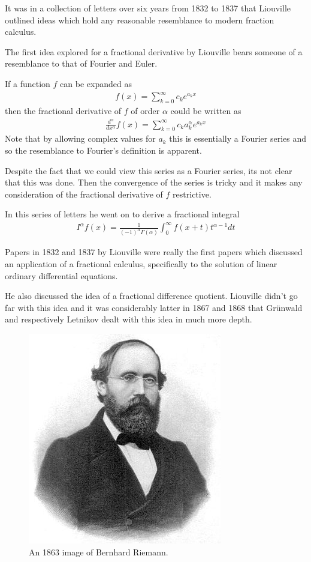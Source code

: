 It was in a collection of letters over six years from 1832 to 1837 that Liouville outlined ideas which hold any reasonable resemblance to modern fraction calculus. 

The first idea explored for a fractional derivative by Liouville bears someone of a resemblance to that of Fourier and Euler. 

If a function $ f $ can be expanded as 
\begin{align}
	f(x) = \sum_{k=0}^\infty c_k e^{a_kx}
\end{align}
then the fractional derivative of $ f $ of order $ \alpha $ could be written as
\begin{align}
	\frac{d^\alpha}{dx^\alpha} f(x) = \sum_{k=0}^\infty c_k a_k^\alpha e^{a_k x}
\end{align}
Note that by allowing complex values for $ a_k $ this is essentially a Fourier series and so the resemblance to Fourier's definition is apparent.

Despite the fact that we could view this series as a Fourier series, its not clear that this was done. Then the convergence of the series is tricky and it makes any consideration of the fractional derivative of $ f $ restrictive. 

In this series of letters he went on to derive a fractional integral
\begin{align}
	I^\alpha f(x) = \frac{1}{(-1)^\alpha \Gamma(\alpha)} \int_0^\infty f(x + t)t^{\alpha - 1} dt
\end{align}

Papers in 1832 and 1837 by Liouville were really the first papers which discussed an application of a fractional calculus, specifically to the solution of linear ordinary differential equations. 

He also discussed the idea of a fractional difference 
quotient.
Liouville didn't go far with this idea and it was considerably latter in 1867 and 1868 that Gr{\"u}nwald and respectively Letnikov dealt with this idea in much more depth. 
 
\begin{figure}
    \includegraphics[scale=0.6]{images/Georg_Friedrich_Bernhard_Riemann}
    \caption{An 1863 image of Bernhard Riemann.}
\end{figure}

